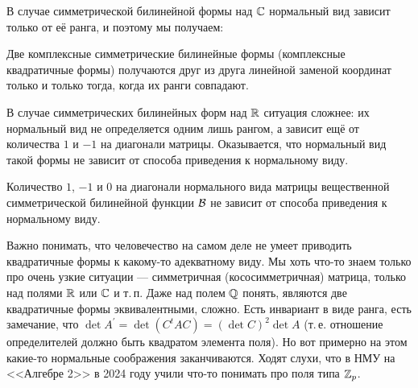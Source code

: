 В случае симметрической билинейной формы над $\mathbb{C}$ нормальный вид зависит только от её ранга, и поэтому мы получаем:

\begin{proposal}
    Две комплексные симметрические билинейные формы (комплексные квадратичные формы) получаются друг из друга линейной заменой координат только и только тогда, когда их ранги совпадают.
\end{proposal}

В случае симметрических билинейных форм над $\mathbb{R}$ ситуация сложнее: их нормальный вид не определяется одним лишь рангом, а зависит ещё от количества $1$ и $-1$ на диагонали матрицы. Оказывается, что нормальный вид такой формы не зависит от способа приведения к нормальному виду.

\begin{theorem}
    Количество $1$, $-1$ и $0$ на диагонали нормального вида матрицы вещественной симметрической билинейной функции $\mathcal{B}$ не зависит от способа приведения к нормальному виду.
\end{theorem}

\begin{remark}
    Важно понимать, что человечество на самом деле не умеет приводить квадратичные формы к какому-то адекватному виду. Мы хоть что-то знаем только про очень узкие ситуации --- симметричная (кососимметричная) матрица, только над полями $\mathbb{R}$ или $\mathbb{C}$ и т.\,п. Даже над полем $\mathbb{Q}$ понять, являются две квадратичные формы эквивалентными, сложно. Есть инвариант в виде ранга, есть замечание, что $\det A^\prime = \det (C^tAC) = (\det C)^2\det A$ (т.\,е. отношение определителей должно быть квадратом элемента поля). Но вот примерно на этом какие-то нормальные соображения заканчиваются. Ходят слухи, что в НМУ на <<Алгебре 2>> в 2024 году учили что-то понимать про поля типа $\mathbb{Z}_p$.
\end{remark}

